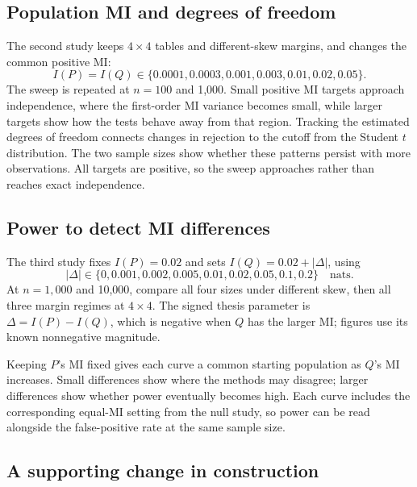 \subsection{Population MI and degrees of freedom}

The second study keeps \(4\times4\) tables and different-skew margins,
and changes the common positive MI:
\begin{equation}
 I(P)=I(Q)\in\{0.0001,0.0003,0.001,0.003,0.01,0.02,0.05\}.
 \label{eq:association-grid}
\end{equation}
The sweep is repeated at \(n=100\) and 1,000. Small positive MI targets
approach independence, where the first-order MI variance becomes small,
while larger targets show how the tests behave away from that region. Tracking
the estimated degrees of freedom connects changes in rejection to the
cutoff from the Student \(t\) distribution. The two sample sizes show
whether these patterns persist with more observations. All targets are
positive, so the sweep approaches rather than reaches exact independence.

\subsection{Power to detect MI differences}

The third study fixes \(I(P)=0.02\) and sets \(I(Q)=0.02+|\Delta|\),
using
\begin{equation}
 |\Delta|\in\{0,0.001,0.002,0.005,0.01,0.02,0.05,0.1,0.2\}
 \quad\text{nats}.
 \label{eq:detection-grid}
\end{equation}
At \(n=1{,}000\) and 10,000, compare all four sizes under different skew,
then all three margin regimes at \(4\times4\).
The signed thesis parameter is \(\Delta=I(P)-I(Q)\), which is negative
when \(Q\) has the larger MI; figures use its known nonnegative magnitude.

Keeping \(P\)'s MI fixed gives each curve a common starting population
as \(Q\)'s MI increases. Small differences show where the methods may
disagree; larger differences show whether power eventually becomes high.
Each curve includes the corresponding equal-MI setting from the null
study, so power can be read alongside the false-positive rate at the
same sample size.

\subsection{A supporting change in construction}

